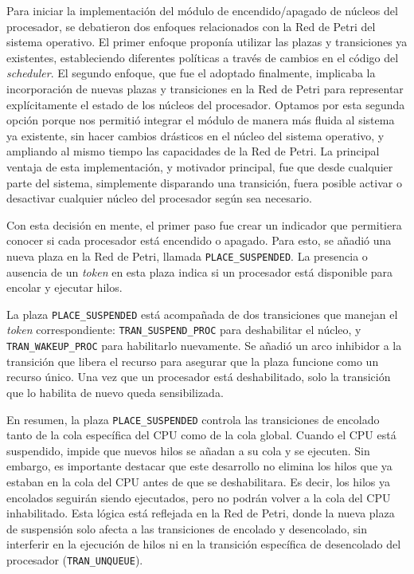 Para iniciar la implementación del módulo de encendido/apagado de núcleos del procesador, se debatieron dos enfoques relacionados con la Red de Petri del sistema operativo. El primer enfoque proponía utilizar las plazas y transiciones ya existentes, estableciendo diferentes políticas a través de cambios en el código del \textit{scheduler}. El segundo enfoque, que fue el adoptado finalmente, implicaba la incorporación de nuevas plazas y transiciones en la Red de Petri para representar explícitamente el estado de los núcleos del procesador. Optamos por esta segunda opción porque nos permitió integrar el módulo de manera más fluida al sistema ya existente, sin hacer cambios drásticos en el núcleo del sistema operativo, y ampliando al mismo tiempo las capacidades de la Red de Petri. La principal ventaja de esta implementación, y motivador principal, fue que desde cualquier parte del sistema, simplemente disparando una transición, fuera posible activar o desactivar cualquier núcleo del procesador según sea necesario.

Con esta decisión en mente, el primer paso fue crear un indicador que permitiera conocer si cada procesador está encendido o apagado. Para esto, se añadió una nueva plaza en la Red de Petri, llamada \texttt{PLACE\_SUSPENDED}. La presencia o ausencia de un \textit{token} en esta plaza indica si un procesador está disponible para encolar y ejecutar hilos.

La plaza \texttt{PLACE\_SUSPENDED} está acompañada de dos transiciones que manejan el \textit{token} correspondiente: \texttt{TRAN\_SUSPEND\_PROC} para deshabilitar el núcleo, y \texttt{TRAN\_WAKEUP\_PROC} para habilitarlo nuevamente. Se añadió un arco inhibidor a la transición que libera el recurso para asegurar que la plaza funcione como un recurso único. Una vez que un procesador está deshabilitado, solo la transición que lo habilita de nuevo queda sensibilizada.

En resumen, la plaza \texttt{PLACE\_SUSPENDED} controla las transiciones de encolado tanto de la cola específica del CPU como de la cola global. Cuando el CPU está suspendido, impide que nuevos hilos se añadan a su cola y se ejecuten. Sin embargo, es importante destacar que este desarrollo no elimina los hilos que ya estaban en la cola del CPU antes de que se deshabilitara. Es decir, los hilos ya encolados seguirán siendo ejecutados, pero no podrán volver a la cola del CPU inhabilitado. Esta lógica está reflejada en la Red de Petri, donde la nueva plaza de suspensión solo afecta a las transiciones de encolado y desencolado, sin interferir en la ejecución de hilos ni en la transición específica de desencolado del procesador (\texttt{TRAN\_UNQUEUE}).

